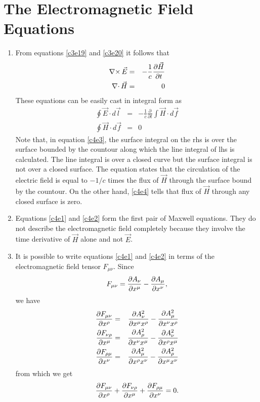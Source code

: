 \chapter{The Electromagnetic Field Equations}\label{c4}
\begin{enumerate}
\item From equations \eqref{c3e19} and \eqref{c3e20} it follows that
\begin{eqnarray}
\operatorname{\nabla\times}\vec{E} &=& -\frac{1}{c}\frac{\partial{\vec{H}}}{\partial{t}} \label{c4e1} \\
\operatorname{\nabla\cdot}\vec{H} &=& 0 \label{c4e2}
\end{eqnarray}
These equations can be easily cast in integral form as 
\begin{eqnarray}
\oint\vec{E}\cdot d\vec{l} &=& -\frac{1}{c}
	\frac{\partial}{\partial t}\int\vec{H}\cdot d\vec{f} \label{c4e3} \\
\oint\vec{H}\cdot d\vec{f} &=& 0 \label{c4e4}
\end{eqnarray}
Note that, in equation \eqref{c4e3}, the surface integral on the rhs is over the
surface bounded by the countour along which the line integral of lhs is 
calculated. The line integral is over a closed curve but the surface integral 
is not over a closed surface. The equation states that the circulation of 
the electric field is equal to $-1/c$ times the flux of $\vec{H}$ through 
the surface bound by the countour. On the other hand, \eqref{c4e4} tells that 
flux of $\vec{H}$ through any closed surface is zero.

\item Equations \eqref{c4e1} and \eqref{c4e2} form the first pair of Maxwell
equations. They do not describe the electromagnetic field completely because
they involve the time derivative of $\vec{H}$ alone and not $\vec{E}$.

\item It is possible to write equations \eqref{c4e1} and \eqref{c4e2} in terms
of the electromagnetic field tensor $F_{\mu\nu}$. Since
\[
F_{\mu\nu} = \frac{\partial{A_\nu}}{\partial{x^\mu}} - \frac{\partial{A_\mu}}{\partial{x^\nu}},
\]
we have
\begin{eqnarray*}
\frac{\partial{F_{\mu\nu}}}{\partial{x^\rho}} &=& 
\frac{\partial{A^2_\nu}}{\partial{x^\mu x^\rho}} - \frac{\partial{A^2_\mu}}{\partial{x^\nu x^\rho}} \\
\frac{\partial{F_{\nu\rho}}}{\partial{x^\mu}} &=& 
\frac{\partial{A^2_\rho}}{\partial{x^\nu x^\mu}} - \frac{\partial{A^2_\nu}}{\partial{x^\rho x^\mu}} \\
\frac{\partial{F_{\rho\mu}}}{\partial{x^\nu}} &=& 
\frac{\partial{A^2_\mu}}{\partial{x^\rho x^\nu}} - \frac{\partial{A^2_\rho}}{\partial{x^\mu x^\nu}}
\end{eqnarray*}
from which we get
\begin{equation}\label{c4e5}
\frac{\partial{F_{\mu\nu}}}{\partial{x^\rho}} + \frac{\partial{F_{\nu\rho}}}{\partial{x^\mu}} + 
\frac{\partial{F_{\rho\mu}}}{\partial{x^\nu}} = 0.
\end{equation}


\end{enumerate}
